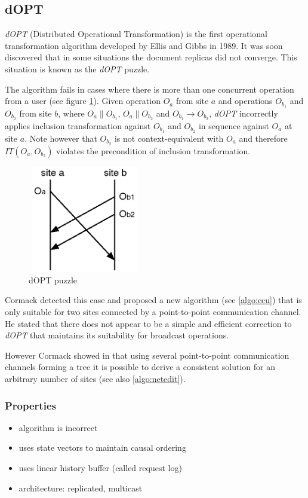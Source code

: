 \subsection{dOPT}
\label{algo:dopt}

\emph{dOPT} (Distributed Operational Transformation) is the first operational transformation algorithm developed by {Ellis and Gibbs}\cite{ellis} in 1989. It was soon discovered that in some situations the document replicas did not converge. This situation is known as the \emph{dOPT} puzzle.

The algorithm fails in cases where there is more than one concurrent operation from a user (see figure \ref{fig:doptpuzzle}). Given operation $O_{a}$ from site $a$ and operations $O_{b_{1}}$ and $O_{b_{2}}$ from site $b$, where $O_{a} \parallel O_{b_{1}}$, $O_{a} \parallel O_{b_{2}}$ and $O_{b_{1}} \rightarrow O_{b_{2}}$, \emph{dOPT} incorrectly applies inclusion transformation against $O_{b_{1}}$ and $O_{b_{2}}$ in sequence against $O_{a}$ at site $a$. Note however that $O_{b_{2}}$ is not context-equivalent with $O_{a}$ and therefore $IT(O_{a},O_{b_{2}})$ violates the precondition of inclusion transformation.

\begin{figure}[H]
 \centering
 \includegraphics[width=1.94in,height=1.83in]{../../images/dopt_puzzle.eps}
 \caption{dOPT puzzle}
 \label{fig:doptpuzzle}
\end{figure}

Cormack\cite{cormack95a} detected this case and proposed a new algorithm (see \ref{algo:ccu}) that is only suitable for two sites connected by a point-to-point communication channel. He stated that there does not appear to be a simple and efficient correction to \emph{dOPT} that maintains its suitability for broadcast operations.

However Cormack showed in \cite{cormack95b} that using several point-to-point communication channels forming a tree it is possible to derive a consistent solution for an arbitrary number of sites (see also \ref{algo:netedit}).

\subsubsection{Properties}
\begin{itemize}
 \item algorithm is incorrect
 \item uses state vectors to maintain causal ordering
 \item uses linear history buffer (called request log)
 \item architecture: replicated, multicast
\end{itemize}
